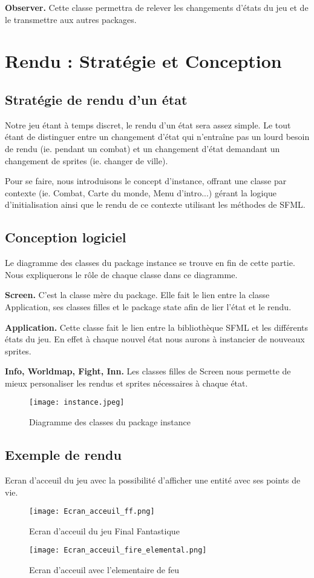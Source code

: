 \documentclass[12pt,a4paper]{report}
\begin{document}
\textbf{Observer.} Cette classe permettra de relever les changements d'\'{e}tats du jeu et de le transmettre aux autres packages.


\chapter{Rendu : Strat\'{e}gie et Conception}
\section{Strat\'{e}gie de rendu d'un état}
Notre jeu \'{e}tant à temps discret, le rendu d'un \'{e}tat sera assez simple. Le tout étant de distinguer entre un changement d'\'{e}tat qui n'entra\^{i}ne pas un lourd besoin de rendu (ie. pendant un combat) et un changement d'\'{e}tat demandant un changement de sprites (ie. changer de ville).

Pour se faire, nous introduisons le concept d'instance, offrant une classe par contexte (ie. Combat, Carte du monde, Menu d'intro...) g\'{e}rant la logique d'initialisation ainsi que le rendu de ce contexte utilisant les m\'{e}thodes de SFML.
\section{Conception logiciel}
Le diagramme des classes du package instance se trouve en fin de cette partie. Nous expliquerons le r\^{o}le de chaque classe dans ce diagramme.

\textbf{Screen.} C'est la classe m\`{e}re du package. Elle fait le lien entre la classe Application, ses classes filles et le package state afin de lier l'\'{e}tat et le rendu.

\textbf{Application.} Cette classe fait le lien entre la biblioth\`{e}que SFML et les diff\'{e}rents \'{e}tats du jeu. En effet \`{a} chaque nouvel \'{e}tat nous aurons \`{a} instancier de nouveaux sprites.

\textbf{Info, Worldmap, Fight, Inn.} Les classes filles de Screen nous permette de mieux personaliser les rendus et sprites n\'{e}cessaires \`{a} chaque \'{e}tat.

\begin{sidewaysfigure}[ht]
\caption{Diagramme des classes du package instance}
\texttt{[image: instance.jpeg]}
\end{sidewaysfigure}
 
\section{Exemple de rendu}

Ecran d'acceuil du jeu avec la possibilité d'afficher une entité avec ses points de vie.

\begin{sidewaysfigure}[ht]
\caption{Ecran d'acceuil du jeu Final Fantastique}
\texttt{[image: Ecran\_acceuil\_ff.png]}
\end{sidewaysfigure}

\begin{sidewaysfigure}[ht]
\caption{Ecran d'acceuil avec l'elementaire de feu}
\texttt{[image: Ecran\_acceuil\_fire\_elemental.png]}
\end{sidewaysfigure}
\end{document}
